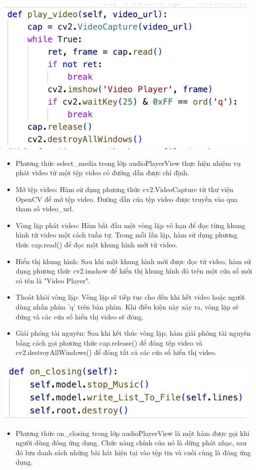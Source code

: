 \documentclass[a4paper]{article}
\begin{document}
\begin{center}
\includegraphics[width=130mm]{template_SGU 2/audio_playVideo.png}
\end{center}
\begin{itemize}
    \item Phương thức select\_media trong lớp audioPlayerView thực hiện nhiệm vụ phát video từ một tệp video có đường dẫn được chỉ định.
    \item Mở tệp video: Hàm sử dụng phương thức cv2.VideoCapture từ thư viện OpenCV để mở tệp video. Đường dẫn của tệp video được truyền vào qua tham số video\_url.
    \item Vòng lặp phát video: Hàm bắt đầu một vòng lặp vô hạn để đọc từng khung hình từ video một cách tuần tự. Trong mỗi lần lặp, hàm sử dụng phương thức cap.read() để đọc một khung hình mới từ video.
    \item Hiển thị khung hình: Sau khi một khung hình mới được đọc từ video, hàm sử dụng phương thức cv2.imshow để hiển thị khung hình đó trên một cửa sổ mới có tên là "Video Player".
    \item Thoát khỏi vòng lặp: Vòng lặp sẽ tiếp tục cho đến khi hết video hoặc người dùng nhấn phím 'q' trên bàn phím. Khi điều kiện này xảy ra, vòng lặp sẽ dừng và các cửa sổ hiển thị video sẽ đóng.
    \item Giải phóng tài nguyên: Sau khi kết thúc vòng lặp, hàm giải phóng tài nguyên bằng cách gọi phương thức cap.release() để đóng tệp video và cv2.destroyAllWindows() để đóng tất cả các cửa sổ hiển thị video.
    
\end{itemize}

\begin{center}
\includegraphics[width=130mm]{template_SGU 2/audio_onClosing.png}
\end{center}
\begin{itemize}
    \item Phương thức on\_closing trong lớp audioPlayerView là một hàm được gọi khi người dùng đóng ứng dụng. Chức năng chính của nó là dừng phát nhạc, sau đó lưu danh sách những bài hát hiện tại vào tệp tin và cuối cùng là đóng ứng dụng.
\end{itemize}
\end{document}
